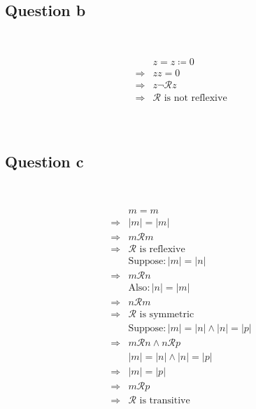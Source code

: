 \documentclass{article}
\begin{document}
~

\subsection*{Question b}

~

\begin{equation*}
    \begin{split}
        &z=z\coloneqq0\\
        \Rightarrow&zz=0\\
        \Rightarrow&z\lnot \mathcal{R} z\\
        \Rightarrow&\mathcal{R}\text{ is not reflexive}\\
    \end{split}
\end{equation*}

~

\subsection*{Question c}

~

\begin{equation*}
    \begin{split}
        &m=m\\
        \Rightarrow&|m|=|m|\\
        \Rightarrow&m\mathcal{R} m\\
        \Rightarrow&\mathcal{R} \text{ is reflexive}\\
        &\text{Suppose}:|m|=|n|\\
        \Rightarrow&m\mathcal{R} n\\
        &\text{Also}:|n|=|m|\\
        \Rightarrow&n\mathcal{R} m\\
        \Rightarrow&\mathcal{R} \text{ is symmetric}\\
        &\text{Suppose}:|m|=|n|\land|n|=|p|\\
        \Rightarrow&m\mathcal{R} n\land n\mathcal{R} p\\
        &|m|=|n|\land|n|=|p|\\
        \Rightarrow&|m|=|p|\\
        \Rightarrow&m\mathcal{R} p\\
        \Rightarrow&\mathcal{R} \text{ is transitive}\\
    \end{split}
\end{equation*}
\end{document}
